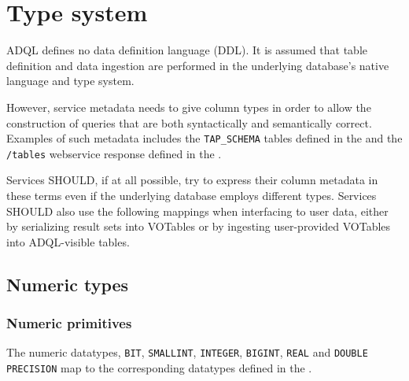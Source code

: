\documentclass[11pt,a4paper]{ivoa}
\begin{document}
\section{Type system}
\label{sec:types}

ADQL defines no data definition language (DDL).
It is assumed that table definition and data ingestion are performed in
the underlying database's native language and type system.

However, service metadata needs to give column types in order to allow the
construction of queries that are both syntactically and semantically correct.
Examples of such metadata includes the \verb:TAP_SCHEMA: tables defined in the
\TAPSpec{} and the \verb:/tables: webservice response defined in the
\VOSISpec{}.

Services SHOULD, if at all possible, try to express their column metadata in
these terms even if the underlying database employs different types.
Services SHOULD also use the following mappings when interfacing to user data,
either by serializing result sets into VOTables or by ingesting user-provided
VOTables into ADQL-visible tables.

\subsection{Numeric types}
\label{sec:types.numeric}

\subsubsection{Numeric primitives}
\label{sec:types.numeric.primitive}

The numeric datatypes, \verb:BIT:, \verb:SMALLINT:, \verb:INTEGER:,
\verb:BIGINT:, \verb:REAL:  \linebreak and \verb:DOUBLE PRECISION: map to the
corresponding datatypes defined in the \VOTableSpec{}.
\end{document}
